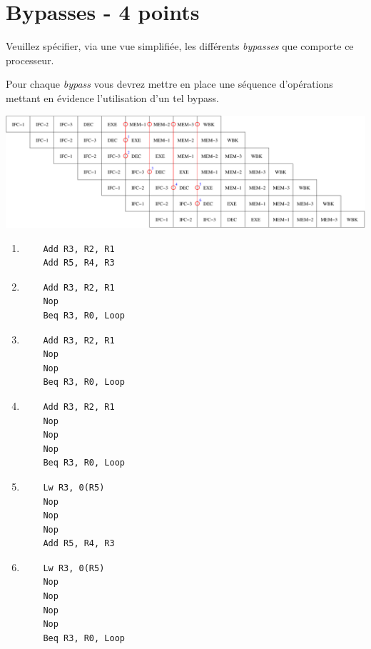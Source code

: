 %
%

\section{Bypasses - 4 points}

Veuillez sp\'ecifier, via une vue simplifi\'ee, les diff\'erents
\textit{bypasses} que comporte ce processeur.

Pour chaque \textit{bypass} vous devrez mettre en place une s\'equence
d'op\'erations mettant en \'evidence l'utilisation d'un tel bypass.

\begin{correction}

  \begin{center}
    \includegraphics[scale=0.6]{figures/correction-bypasses.pdf}
  \end{center}

  \begin{enumerate}
    \item
      \begin{verbatim}
	Add R3, R2, R1
	Add R5, R4, R3
      \end{verbatim}
    \item
      \begin{verbatim}
	Add R3, R2, R1
	Nop
	Beq R3, R0, Loop
      \end{verbatim}
    \item
      \begin{verbatim}
	Add R3, R2, R1
	Nop
	Nop
	Beq R3, R0, Loop
      \end{verbatim}
    \item
      \begin{verbatim}
	Add R3, R2, R1
	Nop
	Nop
	Nop
	Beq R3, R0, Loop
      \end{verbatim}
    \item
      \begin{verbatim}
	Lw R3, 0(R5)
	Nop
	Nop
	Nop
	Add R5, R4, R3
      \end{verbatim}
    \item
      \begin{verbatim}
	Lw R3, 0(R5)
	Nop
	Nop
	Nop
	Nop
	Beq R3, R0, Loop
      \end{verbatim}
  \end{enumerate}

\end{correction}

